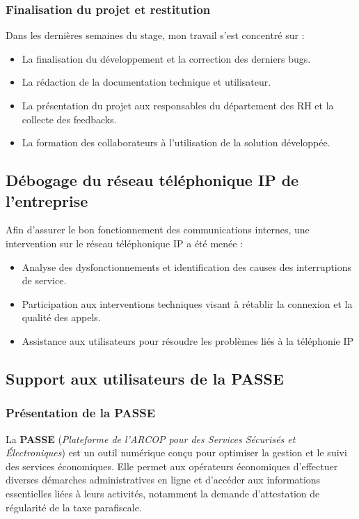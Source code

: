 \subsubsection{Finalisation du projet et restitution}
Dans les dernières semaines du stage, mon travail s'est concentré sur :

\begin{itemize}
    \item La finalisation du développement et la correction des derniers bugs.
    \item La rédaction de la documentation technique et utilisateur.
    \item La présentation du projet aux responsables du département des \ac{RH} et la collecte des feedbacks.
    \item La formation des collaborateurs à l'utilisation de la solution développée.

\end{itemize}
\subsection{Débogage du réseau téléphonique IP de l'entreprise}
Afin d’assurer le bon fonctionnement des communications internes, une intervention sur le réseau téléphonique IP a été menée :
\begin{itemize}
    \item Analyse des dysfonctionnements et identification des causes des interruptions de service.
    \item  Participation aux interventions techniques visant à rétablir la connexion et  la qualité des appels.
    \item Assistance aux utilisateurs pour résoudre les problèmes liés à la téléphonie IP
\end{itemize}


\subsection{Support aux utilisateurs de la \ac{PASSE}}

\subsubsection{Présentation de la PASSE}
La \textbf{\ac{PASSE}} (\textit{Plateforme de l’ARCOP pour des Services Sécurisés et Électroniques}) est un outil numérique conçu pour optimiser la gestion et le suivi des services économiques. Elle permet aux opérateurs économiques d’effectuer diverses démarches administratives en ligne et d’accéder aux informations essentielles liées à leurs activités, notamment la demande d’attestation de régularité de la taxe parafiscale.

